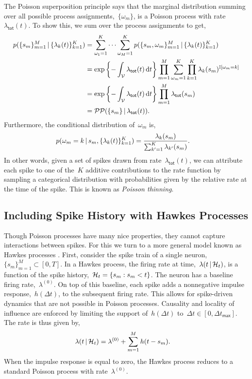 The Poisson superposition principle says that the marginal distribution
summing over all possible process assignments,~$\{\omega_m\}$, is a Poisson
process with rate~$\lambda_{\mathsf{tot}}(t)$. To show this, we sum over
the process assignments to get,
\begin{align*}
  p(\{s_m\}_{m=1}^M \,|\, \{\lambda_k(t)\}_{k=1}^K)
  &= \sum_{\omega_1=1}^K \cdots \sum_{\omega_M=1}^K p(\{s_m, \omega_m\}_{m=1}^M \,|\, \{\lambda_k(t)\}_{k=1}^K) \\
  &= \exp\left\{-\int_{\mathcal{V}} \lambda_{\mathsf{tot}}(t) \, \mathrm{d}t\right\}
  \prod_{m=1}^M \sum_{\omega_m=1}^K \prod_{k=1}^K \lambda_k(s_m)^{\mathbb{I}[\omega_m = k]} \\
  &= \exp\left\{-\int_{\mathcal{V}} \lambda_{\mathsf{tot}}(t) \, \mathrm{d}t\right\}
  \prod_{m=1}^M \lambda_{\mathsf{tot}}(s_m) \\
  &= \mathcal{PP}(\{s_m\} \,|\, \lambda_{\mathsf{tot}}(t)).
\end{align*}
Furthermore, the conditional distribution of~$\omega_m$ is,
\begin{align*}
  p(\omega_m=k \,|\, s_m, \{\lambda_k(t)\}_{k=1}^K)
  &= \frac{\lambda_k(s_m)}{\sum_{k'=1}^K \lambda_{k'}(s_m)}.
\end{align*}
In other words, given a set of spikes drawn from rate~$\lambda_{\mathsf{tot}}(t)$,
we can attribute each spike to one of the~$K$ additive contributions
to the rate function by sampling a categorical distribution with probabilities
given by the relative rate at the time of the spike. This is known as
\emph{Poisson thinning}.

\subsection{Including Spike History with Hawkes Processes}
Though Poisson processes have many nice properties, they cannot
capture interactions between spikes. For this we turn to a more
general model known as Hawkes processes \citep{Hawkes-1971}. 
First, consider the spike train of a single neuron,~$\{s_m\}_{m=1}^M \subset [0,T]$.
In a Hawkes process, the firing rate at time,~$\lambda(t \,|\, \mathcal{H}_t)$, is a function of 
the spike history,~${\mathcal{H}_t = \{s_m: s_m < t\}}$.  The neuron has a 
baseline firing rate,~$\lambda^{(0)}$. On top of this baseline, 
each spike 
adds a nonnegative impulse response,~$h(\Delta t)$, to the 
subsequent firing rate.  This allows for spike-driven dynamics that are not possible in Poisson
processes.  Causality and
locality of influence are enforced by limiting the support of~$h(\Delta
t)$ to~${\Delta t \in [0,\Delta t_{\mathsf{max}}]}$.
The rate is thus given by,
\begin{align*}
  \lambda(t \,|\, \mathcal{H}_t)
  &= \lambda^{(0)} + \sum_{m=1}^M h(t - s_m).
\end{align*}
When the impulse response is equal to zero, the Hawkes process
reduces to a standard Poisson process with rate~$\lambda^{(0)}$.


